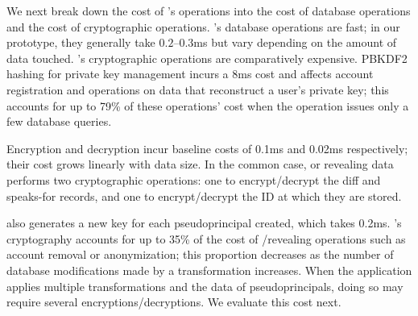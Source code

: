 We next break down the cost of \sys's operations into the cost of database
operations and the cost of cryptographic operations.
%
%
%
%
\sys's database operations are fast; in our prototype, they generally take
$0.2$--$0.3$ms but vary depending on the amount of data touched.
%
%
\sys's cryptographic operations are comparatively expensive.
%
PBKDF2 hashing for private key management incurs a 8ms cost and affects account
registration and operations on \xxed data that reconstruct a user's private key;
this accounts for up to 79\% of these operations' cost when the operation issues
only a few database queries.
%
%
%

Encryption and decryption incur baseline costs of 0.1ms and 0.02ms respectively;
their cost grows linearly with data size.
%
In the common case, \xxing or revealing data performs two cryptographic
operations: one to encrypt/decrypt the diff and speaks-for records, and one to
encrypt/decrypt the ID at which they are stored.
%

\sys also generates a new key for each pseudoprincipal created, which takes
0.2ms.
\sys's cryptography accounts for up to 35\%
of the cost of \xxing/revealing operations such as account removal or
anonymization; this proportion decreases as the number of database
modifications made by a transformation increases.
%
When the application applies multiple \xxing transformations and \xxs the
data of pseudoprincipals, doing so may require several encryptions/decryptions.
%
We evaluate this cost next.
%

